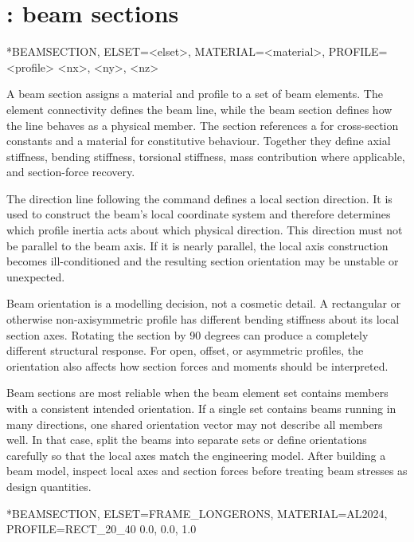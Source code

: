 \clearpage

\section{: beam sections}

\begin{syntax}
*BEAMSECTION, ELSET=<elset>, MATERIAL=<material>, PROFILE=<profile>
<nx>, <ny>, <nz>
\end{syntax}

A beam section assigns a material and profile to a set of beam elements. The element connectivity defines the beam line, while the beam section defines how the line behaves as a physical member. The section references a  for cross-section constants and a material for constitutive behaviour. Together they define axial stiffness, bending stiffness, torsional stiffness, mass contribution where applicable, and section-force recovery.

The direction line following the command defines a local section direction. It is used to construct the beam's local coordinate system and therefore determines which profile inertia acts about which physical direction. This direction must not be parallel to the beam axis. If it is nearly parallel, the local axis construction becomes ill-conditioned and the resulting section orientation may be unstable or unexpected.

Beam orientation is a modelling decision, not a cosmetic detail. A rectangular or otherwise non-axisymmetric profile has different bending stiffness about its local section axes. Rotating the section by 90 degrees can produce a completely different structural response. For open, offset, or asymmetric profiles, the orientation also affects how section forces and moments should be interpreted.

Beam sections are most reliable when the beam element set contains members with a consistent intended orientation. If a single set contains beams running in many directions, one shared orientation vector may not describe all members well. In that case, split the beams into separate sets or define orientations carefully so that the local axes match the engineering model. After building a beam model, inspect local axes and section forces before treating beam stresses as design quantities.

\begin{exampledeck}
*BEAMSECTION, ELSET=FRAME_LONGERONS, MATERIAL=AL2024, PROFILE=RECT_20_40
0.0, 0.0, 1.0
\end{exampledeck}

